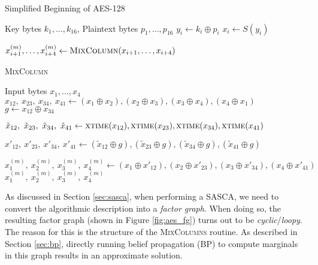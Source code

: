 \begin{algorithm}[ht]
    \caption{Simplified Beginning of AES-128}\label{alg:aes}
    \begin{algorithmic}[1]
    \Require Key bytes $k_1,\dots,k_{16}$, Plaintext bytes $p_1,\dots,p_{16}$
        \State $y_i \gets k_i \oplus p_i$ 
        \State $x_i \gets S(y_i)$ 
    \EndFor


        \State $x_{i+1}^{(m)},\dots,x_{i+4}^{(m)} \gets \textsc{MixColumn}(x_{i+1},\dots,x_{i+4})$ 
    \EndFor
    \end{algorithmic}
\end{algorithm}

\begin{algorithm}[ht]
    \caption{\textsc{MixColumn}}\label{alg:mc}
    \begin{algorithmic}[1]
    \Require Input bytes $x_1,\dots,x_{4}$
    \State $x_{12}, \ x_{23}, \ x_{34}, \ x_{41} \gets (x_1 \oplus x_2), (x_2 \oplus x_3), (x_3 \oplus x_4), (x_4 \oplus x_1)$
    \State $g \gets x_{12} \oplus x_{34}$

    \State $\tilde{x}_{12}, \ \tilde{x}_{23}, \ \tilde{x}_{34}, \ \tilde{x}_{41} \gets \textsc{xtime}(x_{12}), \textsc{xtime}(x_{23}), \textsc{xtime}(x_{34}), \textsc{xtime}(x_{41})$

    \State $x'_{12}, \ x'_{23}, \ x'_{34}, \ x'_{41} \gets (\tilde{x}_{12} \oplus g), (\tilde{x}_{23} \oplus g), (\tilde{x}_{34} \oplus g), (\tilde{x}_{41} \oplus g)$

    \State $x^{(m)}_{1}, \ x^{(m)}_{2}, \ x^{(m)}_{3}, \ x^{(m)}_{4} \gets (x_1 \oplus x'_{12}), (x_2 \oplus x'_{23}), (x_3 \oplus x'_{34}), (x_4 \oplus x'_{41})$
    \State \Return $x^{(m)}_{1}, \ x^{(m)}_{2}, \ x^{(m)}_{3}, \ x^{(m)}_{4}$
    \end{algorithmic}
\end{algorithm}

As discussed in Section \ref{sec:sasca}, when performing a SASCA, we need to convert the algorithmic description into a \textit{factor graph}. When doing so, the resulting factor graph (shown in Figure \ref{fig:aes_fg}) turns out to be \textit{cyclic}/\textit{loopy}.
The reason for this is the structure of the \textsc{MixColumns} routine. As described in Section \ref{sec:bp}, directly running belief propagation (BP) to compute marginals in this graph results in an approximate solution. 

